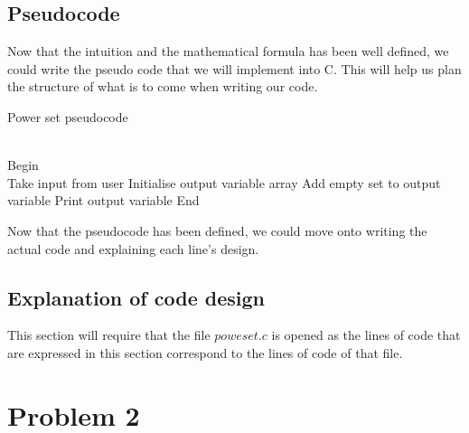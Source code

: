\documentclass[a4paper]{article}
\theoremstyle{plain}
\theoremstyle{definition}
\theoremstyle{remark}
\begin{document}
\subsection{Pseudocode}
Now that the intuition and the mathematical formula has been well defined, we could write the pseudo code that we will implement into C. This will help us plan the structure of what is to come when writing our code.\\

\begin{algorithm}[H]
	\caption{Power set pseudocode}
	\\

	Begin \\
	Take input from user\;
	Initialise output variable array\;
	Add empty set to output variable\;
	Print output variable\;
	End
\end{algorithm}
\begin{flushleft}
Now that the pseudocode has been defined, we could move onto writing the actual code and explaining each line's design.
\end{flushleft}
\subsection{Explanation of code design}
This section will require that the file $poweset.c$ is opened as the lines of code that are expressed in this section correspond to the lines of code of that file.
\section{Problem 2}


	
\end{document}

